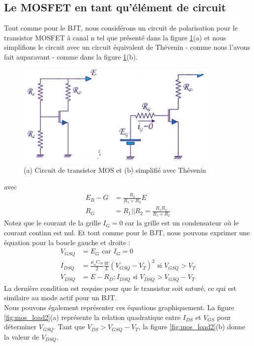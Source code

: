 \subsection{Le MOSFET en tant qu'élément de circuit}
Tout comme pour le BJT, nous considérons un circuit de polarisation pour le transistor MOSFET à canal n tel que présenté dans la figure \ref{fig:mos_load1}(a) et nous simplifions le circuit avec un circuit équivalent de Thévenin - comme nous l'avons fait auparavant - comme dans la figure \ref{fig:mos_load1}(b).
\begin{figure}[h!]
	\centering
	\includegraphics[width=10cm]{figures/ch02/mos_load1.jpg}
	\caption{(a) Circuit de transistor MOS et (b) simplifié avec Thévenin}
	\label{fig:mos_load1}
\end{figure}
avec
\begin{equation}
	\begin{split}
		E_B-G &= \frac{R_2}{R_1 + R_2} E \\
		R_G &= R_1 || R_2 = \frac{R_1 R_2}{R_1 + R_2}
	\end{split}
\end{equation}
Notez que le courant de la grille $I_G = 0$ car la grille est un condensateur où le courant continu est nul. Et tout comme pour le BJT, nous pouvons exprimer une équation pour la boucle gauche et droite :
\begin{equation}
	\begin{split}
		V_{GSQ} &= E_G \text{ car } I_{G} = 0\\
		I_{DSQ} &= \frac{\mu_n C_{ox}}{2} \frac{W}{L} (V_{GSQ} - V_T)^2 \text{ si } V_{GSQ} > V_T\\
		V_{DSQ} &= E - R_D ; I_{DSQ} \text{ si } V_{DSQ} > V_{GSQ} - V_T
	\end{split}
\end{equation}
La dernière condition est requise pour que le transistor soit saturé, ce qui est similaire au mode actif pour un BJT.\\
Nous pouvons également représenter ces équations graphiquement. La figure \ref{fig:mos_load2}(a) représente la relation quadratique entre $I_{DS}$ et $V_{GS}$ pour déterminer $V_{GSQ}$. Tant que $V_{DS} > V_{GSQ} - V_T$, la figure \ref{fig:mos_load2}(b) donne la valeur de $V_{DSQ}$.
